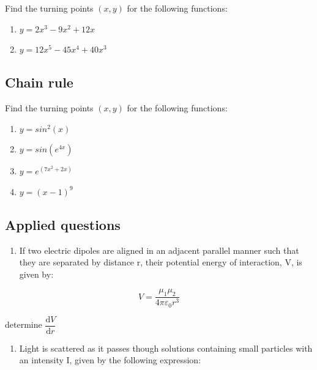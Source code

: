 \documentclass[
]{book}
\providecommand{\tightlist}{%
  \setlength{\itemsep}{0pt}\setlength{\parskip}{0pt}}
\begin{document}
Find the turning points \((x,y)\) for the following functions:

\begin{enumerate}
\def\labelenumi{\arabic{enumi}.}
\tightlist
\item
  \(y = 2x^3 - 9x^2 + 12x\)
\item
  \(y = 12x^5 - 45x^4 + 40x^3\)
\end{enumerate}

\hypertarget{chain-rule}{%
\subsection{Chain rule}\label{chain-rule}}

Find the turning points \((x,y)\) for the following functions:

\begin{enumerate}
\def\labelenumi{\arabic{enumi}.}
\tightlist
\item
  \(y = sin^2(x)\)
\item
  \(y = sin(e^{4x})\)
\item
  \(y = e^{(7x^2 + 2x)}\)
\item
  \(y = (x-1)^9\)
\end{enumerate}

\hypertarget{applied-questions}{%
\subsection{Applied questions}\label{applied-questions}}

\begin{enumerate}
\def\labelenumi{\arabic{enumi}.}
\tightlist
\item
  If two electric dipoles are aligned in an adjacent parallel manner such that they are separated by distance r, their potential energy of interaction, V, is given by:
\end{enumerate}

\begin{equation*}
V = \frac{\mu_1 \mu_2}{4 \pi \varepsilon_0 r^3}
\end{equation*}

determine \(\dfrac{\textrm{d}V}{\textrm{d}r}\)

\begin{enumerate}
\def\labelenumi{\arabic{enumi}.}
\setcounter{enumi}{1}
\tightlist
\item
  Light is scattered as it passes though solutions containing small particles with an intensity I, given by the following expression:
\end{enumerate}
\end{document}
